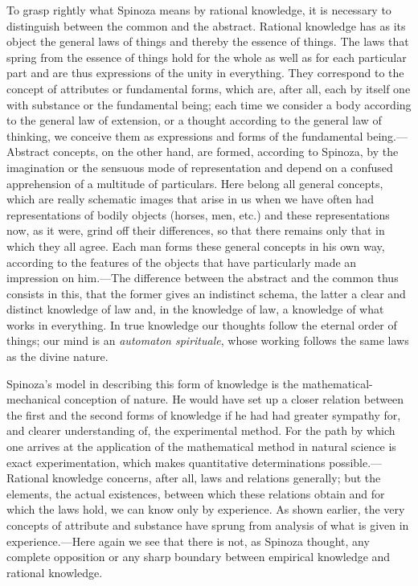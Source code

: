 \documentclass[12pt]{book}
\newcommand{\opage}[1]{\marginnote{\footnotesize\textit{[#1]}}}
\begin{document}
To grasp rightly what Spinoza means by rational knowledge, it is necessary to
distinguish between the common and the abstract. Rational knowledge has as its object
the general laws of things and thereby the essence of things. The laws that spring
from the essence of things hold for the whole as well as for each particular part and
are thus expressions of the unity in everything. They correspond to the concept of
attributes or fundamental forms, which are, after all, each by itself one with substance
or the fundamental being; each time we consider a body according to the general law of
extension, or a thought according to the general law of thinking, we conceive them as
expressions and forms of the fundamental being.---Abstract concepts, on the other hand,
are formed, according to Spinoza, by the imagination or the sensuous mode of
representation and depend on a confused apprehension of a multitude of particulars.
Here belong all general concepts, which are really schematic images that arise in us
when we have often had representations of bodily objects (horses, men, etc.) and these
representations now, as it were, grind off their differences, so that there remains only
that in which they all agree. Each man forms these general concepts in his own way,
according to the features of the objects that have particularly made an impression on
him.---The difference between the abstract and the common thus \opage{110}consists in
this, that the former gives an indistinct schema, the latter a clear and distinct
knowledge of law and, in the knowledge of law, a knowledge of what works in everything.
In true knowledge our thoughts follow the eternal order of things; our mind is an
\textit{automaton spirituale}, whose working follows the same laws as the divine nature.

Spinoza's model in describing this form of knowledge is the mathematical-mechanical
conception of nature. He would have set up a closer relation between the first and the
second forms of knowledge if he had had greater sympathy for, and clearer understanding
of, the experimental method. For the path by which one arrives at the application of the
mathematical method in natural science is exact experimentation, which makes
quantitative determinations possible.---Rational knowledge concerns, after all, laws and
relations generally; but the elements, the actual existences, between which these
relations obtain and for which the laws hold, we can know only by experience. As shown
earlier, the very concepts of attribute and substance have sprung from analysis of what
is given in experience.---Here again we see that there is not, as Spinoza thought, any
complete opposition or any sharp boundary between empirical knowledge and rational
knowledge.
\end{document}
